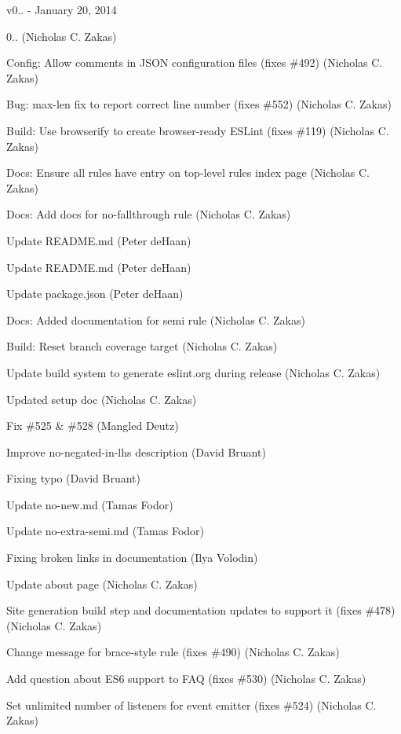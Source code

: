 v0.. -\/ January 20, 2014


\begin{DoxyItemize}
\item 0.. (Nicholas C. Zakas)
\item Config\+: Allow comments in J\+S\+ON configuration files (fixes \#492) (Nicholas C. Zakas)
\item Bug\+: max-\/len fix to report correct line number (fixes \#552) (Nicholas C. Zakas)
\item Build\+: Use browserify to create browser-\/ready E\+S\+Lint (fixes \#119) (Nicholas C. Zakas)
\item Docs\+: Ensure all rules have entry on top-\/level rules index page (Nicholas C. Zakas)
\item Docs\+: Add docs for no-\/fallthrough rule (Nicholas C. Zakas)
\item Update R\+E\+A\+D\+M\+E.\+md (Peter de\+Haan)
\item Update R\+E\+A\+D\+M\+E.\+md (Peter de\+Haan)
\item Update package.\+json (Peter de\+Haan)
\item Docs\+: Added documentation for semi rule (Nicholas C. Zakas)
\item Build\+: Reset branch coverage target (Nicholas C. Zakas)
\item Update build system to generate eslint.\+org during release (Nicholas C. Zakas)
\item Updated setup doc (Nicholas C. Zakas)
\item Fix \#525 \& \#528 (Mangled Deutz)
\item Improve no-\/negated-\/in-\/lhs description (David Bruant)
\item Fixing typo (David Bruant)
\item Update no-\/new.\+md (Tamas Fodor)
\item Update no-\/extra-\/semi.\+md (Tamas Fodor)
\item Fixing broken links in documentation (Ilya Volodin)
\item Update about page (Nicholas C. Zakas)
\item Site generation build step and documentation updates to support it (fixes \#478) (Nicholas C. Zakas)
\item Change message for brace-\/style rule (fixes \#490) (Nicholas C. Zakas)
\item Add question about E\+S6 support to F\+AQ (fixes \#530) (Nicholas C. Zakas)
\item Set unlimited number of listeners for event emitter (fixes \#524) (Nicholas C. Zakas)

\end{DoxyItemize}
